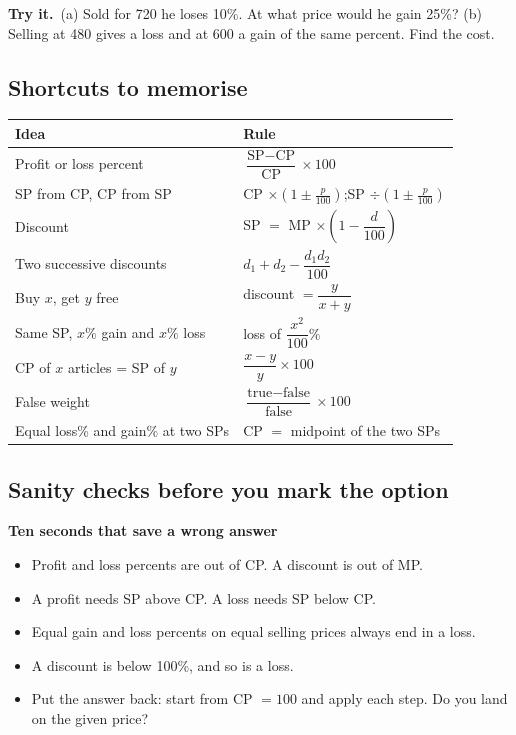\documentclass[11pt,a4paper]{article}
\let\oldsubsection\subsection
\renewcommand{\subsection}{\needspace{9\baselineskip}\oldsubsection}
\newcommand{\tryit}[1]{\textbf{\color{ember}Try it.}\ #1}
\newcommand{\infobox}[2]{\par\medskip\noindent\begingroup\setlength{\fboxsep}{7pt}%
  \colorbox{codebg}{\parbox{\dimexpr\linewidth-14pt\relax}{\textbf{\color{ember}#1}\par\smallskip #2}}\endgroup\par\medskip}
\begin{document}
\tryit (a) Sold for 720 he loses 10\%. At what price would he gain 25\%? (b) Selling at 480 gives a loss and at 600 a gain of the same percent. Find the cost.

\subsection*{Shortcuts to memorise}
\begin{center}\small\renewcommand{\arraystretch}{1.9}\setlength{\tabcolsep}{8pt}
\begin{tabularx}{\linewidth}{@{}>{\raggedright\arraybackslash}X>{\raggedright\arraybackslash}X@{}}
\toprule
\textbf{\color{slate}Idea} & \textbf{\color{slate}Rule} \\ \midrule
Profit or loss percent & $\dfrac{\text{SP}-\text{CP}}{\text{CP}}\times 100$ \\
SP from CP, CP from SP & CP $\times(1\pm\frac{p}{100})$;\quad SP $\div(1\pm\frac{p}{100})$ \\
Discount & SP $=$ MP $\times\left(1-\dfrac{d}{100}\right)$ \\
Two successive discounts & $d_1+d_2-\dfrac{d_1 d_2}{100}$ \\
Buy $x$, get $y$ free & discount $=\dfrac{y}{x+y}$ \\
Same SP, $x\%$ gain and $x\%$ loss & loss of $\dfrac{x^2}{100}\%$ \\
CP of $x$ articles = SP of $y$ & $\dfrac{x-y}{y}\times 100$ \\
False weight & $\dfrac{\text{true}-\text{false}}{\text{false}}\times 100$ \\
Equal loss\% and gain\% at two SPs & CP $=$ midpoint of the two SPs \\
\bottomrule
\end{tabularx}\end{center}

\subsection*{Sanity checks before you mark the option}
\infobox{Ten seconds that save a wrong answer}{
\begin{itemize}
\item Profit and loss percents are out of CP. A discount is out of MP.
\item A profit needs SP above CP. A loss needs SP below CP.
\item Equal gain and loss percents on equal selling prices always end in a loss.
\item A discount is below 100\%, and so is a loss.
\item Put the answer back: start from CP $= 100$ and apply each step. Do you land on the given price?
\end{itemize}}
\end{document}
